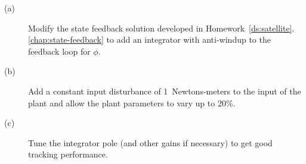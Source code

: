 
\begin{description}\item[]
\item[(a)] Modify the state feedback solution developed in Homework~\ref{ds:satellite}.\ref{chap:state-feedback} to add an integrator with anti-windup to the feedback loop for $\phi$.
\item[(b)] Add a constant input disturbance of 1~Newtons-meters to the input of the plant and allow the plant parameters to vary up to 20\%.
\item[(c)] Tune the integrator pole (and other gains if necessary) to get good tracking performance.
\end{description}

